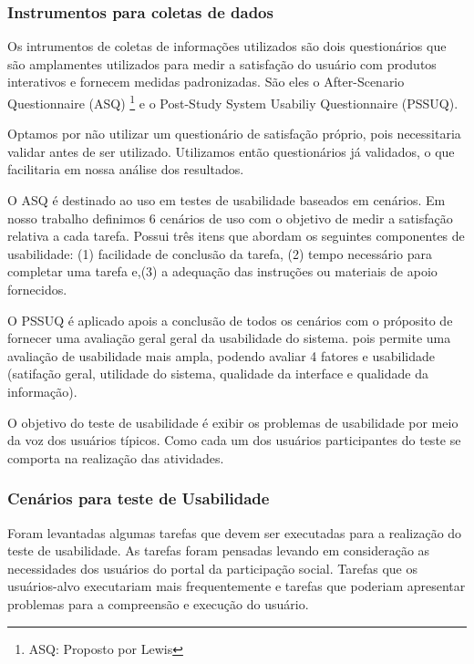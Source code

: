 \subsubsection{Instrumentos para coletas de dados}

	Os intrumentos de coletas de informações utilizados são dois questionários que são amplamentes utilizados para medir a satisfação do usuário com produtos interativos e fornecem medidas padronizadas. São eles o After-Scenario Questionnaire (ASQ) \footnote{ASQ: Proposto por Lewis} e o Post-Study System Usabiliy Questionnaire (PSSUQ). 

	Optamos por não utilizar um questionário de satisfação próprio, pois necessitaria validar antes de ser utilizado.  Utilizamos então questionários já validados, o que facilitaria em nossa análise dos resultados.

	O ASQ é destinado ao uso em testes de usabilidade baseados em cenários. Em nosso trabalho definimos 6 cenários de uso com o objetivo de medir a satisfação relativa a cada tarefa. Possui três itens que abordam os seguintes componentes de usabilidade: (1) facilidade de conclusão da tarefa, (2) tempo necessário para completar uma tarefa e,(3) a adequação das instruções ou materiais de apoio fornecidos.

	O PSSUQ é aplicado apois a conclusão de todos os cenários com o próposito de fornecer uma avaliação geral geral da usabilidade do sistema. pois permite uma avaliação de usabilidade mais ampla, podendo avaliar 4 fatores e usabilidade (satifação geral, utilidade do sistema, qualidade da interface e qualidade da informação). 

	O objetivo do teste de usabilidade é exibir os problemas de usabilidade por meio da voz dos usuários típicos. Como cada um dos usuários participantes do teste se comporta na realização das atividades.

\subsubsection{Cenários para teste de Usabilidade}

	Foram levantadas algumas tarefas que devem ser executadas para a realização do teste de usabilidade. As tarefas foram pensadas levando em consideração as necessidades dos usuários do portal da participação social. Tarefas que os usuários-alvo executariam mais frequentemente e tarefas que poderiam apresentar problemas para a compreensão e execução do usuário. 

